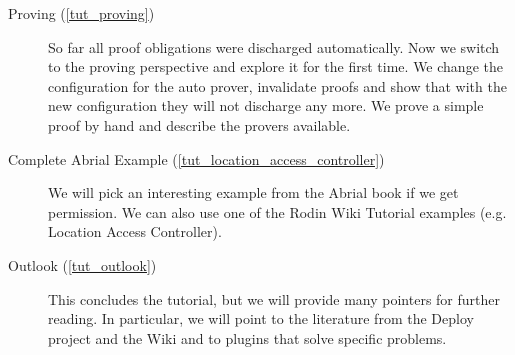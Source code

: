 \begin{description}
	\item[Proving (\ref{tut_proving})] So far all proof obligations were discharged automatically.  Now we switch to the proving perspective and explore it for the first time.
We change the configuration for the auto prover, invalidate proofs and show that with the new configuration they will not discharge any more.  We prove a simple proof by hand and describe the provers available.
	\item[Complete Abrial Example (\ref{tut_location_access_controller})] We will pick an interesting example from the Abrial book if we get permission.  We can also use one of the Rodin Wiki Tutorial examples (e.g. Location Access Controller).
	\item[Outlook (\ref{tut_outlook})] This concludes the tutorial, but we will provide many pointers for further reading.  In particular, we will point to the literature from the Deploy project and the Wiki and to plugins that solve specific problems.
\end{description}

